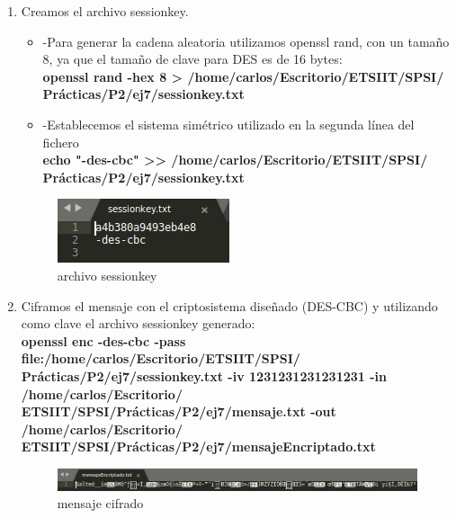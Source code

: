 \begin{enumerate}
	\item Creamos el archivo sessionkey.\\
		\begin{itemize}
			\item -Para generar la cadena aleatoria utilizamos openssl rand, con un tamaño 8, ya que el tamaño de clave para DES es de 16 bytes:\\
			\textbf{openssl rand -hex 8 > /home/carlos/Escritorio/ETSIIT/SPSI/\\Prácticas/P2/ej7/sessionkey.txt}
			
			\item -Establecemos el sistema simétrico utilizado en la segunda línea del fichero\\
			\textbf{echo "-des-cbc" >> /home/carlos/Escritorio/ETSIIT/SPSI/\\Prácticas/P2/ej7/sessionkey.txt}
		\end{itemize}
	
	\begin{figure}[H] %
		\centering
		\includegraphics[scale=1]{imagenes/sessionkeyE7} 
		\caption{archivo sessionkey} \label{etiq}
	\end{figure}
	
	\item Ciframos el mensaje con el criptosistema diseñado (DES-CBC) y utilizando como clave el archivo sessionkey generado: \\
		\textbf{openssl enc -des-cbc -pass file:/home/carlos/Escritorio/ETSIIT/SPSI/\\Prácticas/P2/ej7/sessionkey.txt -iv 1231231231231231 -in /home/carlos/Escritorio/\\ETSIIT/SPSI/Prácticas/P2/ej7/mensaje.txt -out /home/carlos/Escritorio/\\ETSIIT/SPSI/Prácticas/P2/ej7/mensajeEncriptado.txt}
		
		\begin{figure}[H] %
			\centering
			\includegraphics[scale=0.60]{imagenes/mensajeEncriptadoE7} 
			\caption{mensaje cifrado} \label{etiq}
		\end{figure}
	

\end{enumerate}

